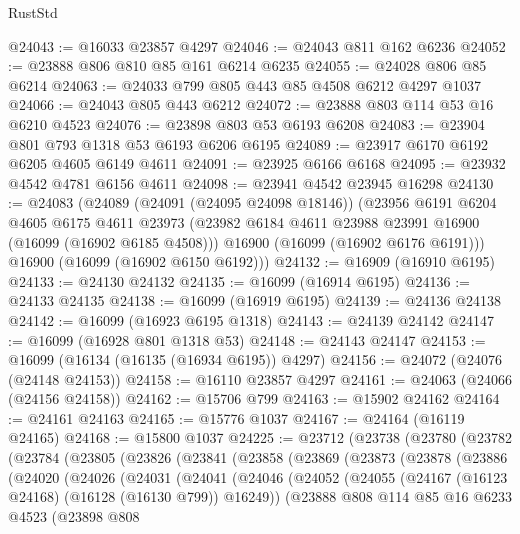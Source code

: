 \begin{lexlean}{RustStd}
\begin{coremodule}
@24043 := @16033 @23857 @4297
@24046 := @24043 @811 @162 @6236
@24052 := @23888 @806 @810 @85 @161 @6214 @6235
@24055 := @24028 @806 @85 @6214
@24063 := @24033 @799 @805 @443 @85 @4508 @6212 @4297 @1037
@24066 := @24043 @805 @443 @6212
@24072 := @23888 @803 @114 @53 @16 @6210 @4523
@24076 := @23898 @803 @53 @6193 @6208
@24083 := @23904 @801 @793 @1318 @53 @6193 @6206 @6195
@24089 := @23917 @6170 @6192 @6205 @4605 @6149 @4611
@24091 := @23925 @6166 @6168
@24095 := @23932 @4542 @4781 @6156 @4611
@24098 := @23941 @4542 @23945 @16298
@24130 := @24083
    (@24089
      (@24091 (@24095 @24098 @18146))
      (@23956
        @6191
        @6204
        @4605
        @6175
        @4611
        @23973
        (@23982 @6184 @4611 @23988 @23991 @16900 (@16099 (@16902 @6185 @4508)))
        @16900
        (@16099 (@16902 @6176 @6191)))
      @16900
      (@16099 (@16902 @6150 @6192)))
@24132 := @16909 (@16910 @6195)
@24133 := @24130 @24132
@24135 := @16099 (@16914 @6195)
@24136 := @24133 @24135
@24138 := @16099 (@16919 @6195)
@24139 := @24136 @24138
@24142 := @16099 (@16923 @6195 @1318)
@24143 := @24139 @24142
@24147 := @16099 (@16928 @801 @1318 @53)
@24148 := @24143 @24147
@24153 := @16099 (@16134 (@16135 (@16934 @6195)) @4297)
@24156 := @24072 (@24076 (@24148 @24153))
@24158 := @16110 @23857 @4297
@24161 := @24063 (@24066 (@24156 @24158))
@24162 := @15706 @799
@24163 := @15902 @24162
@24164 := @24161 @24163
@24165 := @15776 @1037
@24167 := @24164 (@16119 @24165)
@24168 := @15800 @1037
@24225 := @23712
    (@23738
      (@23780
        (@23782
          (@23784
            (@23805
              (@23826
                (@23841
                  (@23858
                    (@23869
                      (@23873
                        (@23878
                          (@23886
                            (@24020
                              (@24026
                                (@24031
                                  (@24041
                                    (@24046
                                      (@24052
                                        (@24055
                                          (@24167 (@16123 @24168) (@16128 (@16130 @799)) @16249))
                                        (@23888
                                          @808
                                          @114
                                          @85
                                          @16
                                          @6233
                                          @4523
                                          (@23898
                                            @808

\end{coremodule}
\end{lexlean}
